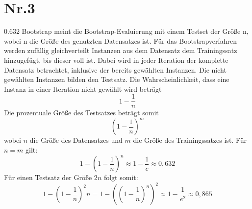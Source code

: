 \documentclass[a4paper,11pt,twoside]{article}
\begin{document}
\section*{Nr.3}
0.632 Bootstrap meint die Bootstrap-Evaluierung mit einem Testset der Größe n, wobei n die Größe des genutzten Datensatzes ist. Für das Bootstrapverfahren werden zufällig gleichverteilt Instanzen aus dem Datensatz dem Trainingssatz hinzugefügt, bis dieser voll ist. Dabei wird in jeder Iteration der komplette Datensatz betrachtet, inklusive der bereits gewählten Instanzen. Die nicht gewählten Instanzen bilden den Testsatz.
Die Wahrscheinlichkeit, dass eine Instanz in einer Iteration nicht gewählt wird beträgt
\[ 1 - \frac{1}{n}  \]
Die prozentuale Größe des Testsatzes beträgt somit
\[ (1 - \frac{1}{n})^m \]
wobei $n$ die Größe des Datensatzes und $m$ die Größe des Trainingssatzes ist. Für $n = m$ gilt:
\[ 1 - (1 - \frac{1}{n})^n \approx 1 - \frac{1}{e} \approx 0,632 \]
Für einen Testsatz der Größe $2n$  folgt somit:
\[ 1 - (1 - \frac{1}{n})^2n = 1 - \left((1 - \frac{1}{n})^n\right)^2  \approx 1 - \frac{1}{e^2} \approx 0,865 \]
\end{document}

